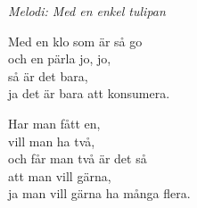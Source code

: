 {\footnotesize\textit{Melodi: Med en enkel tulipan}}\par
\vspace{10pt}
Med en klo som är så go\\
och en pärla jo, jo,\\
så är det bara,\\
ja det är bara att konsumera.\par
\vspace{10pt}
Har man fått en,\\
vill man ha två,\\
och får man två är det så\\
att man vill gärna,\\
ja man vill gärna ha många flera.
